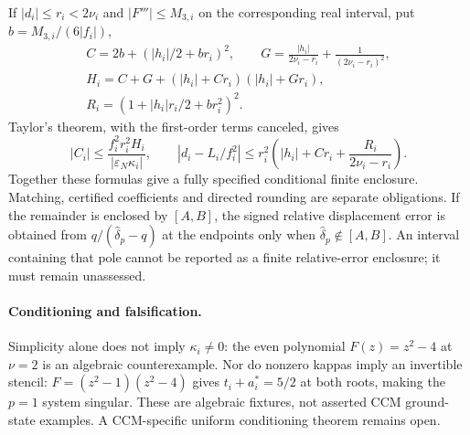 If $|d_i|\le r_i<2\nu_i$ and $|F'''|\le M_{3,i}$ on the corresponding real
interval, put $b=M_{3,i}/(6|f_i|)$,
\begin{gather*}
 C=2b+(|h_i|/2+br_i)^2,\qquad
 G=\frac{|h_i|}{2\nu_i-r_i}+\frac1{(2\nu_i-r_i)^2},\\
 H_i=C+G+(|h_i|+Cr_i)(|h_i|+Gr_i),\\
 R_i=(1+|h_i|r_i/2+br_i^2)^2.
\end{gather*}
Taylor's theorem, with the first-order terms canceled, gives
\[
 |C_i|\le\frac{f_i^2r_i^2H_i}{|\varepsilon_N\kappa_i|},\qquad
 |d_i-L_i/f_i^2|\le r_i^2
       \left(|h_i|+Cr_i+\frac{R_i}{2\nu_i-r_i}\right).
\]
Together these formulas give a fully specified conditional finite enclosure.
Matching, certified coefficients and directed rounding are separate obligations.
If the remainder is enclosed by $[A,B]$, the signed relative displacement
error is obtained from $q/(\widehat\delta_p-q)$ at the endpoints only when
$\widehat\delta_p\notin[A,B]$. An interval containing that pole cannot be
reported as a finite relative-error enclosure; it must remain unassessed.

\paragraph{Conditioning and falsification.}
Simplicity alone does not imply $\kappa_i\ne0$: the even polynomial
$F(z)=z^2-4$ at $\nu=2$ is an algebraic counterexample. Nor do nonzero kappas
imply an invertible stencil: $F=(z^2-1)(z^2-4)$ gives
$t_i+a_i^*=5/2$ at both roots, making the $p=1$ system singular. These are
algebraic fixtures, not asserted CCM ground-state examples. A CCM-specific
uniform conditioning theorem remains open.

